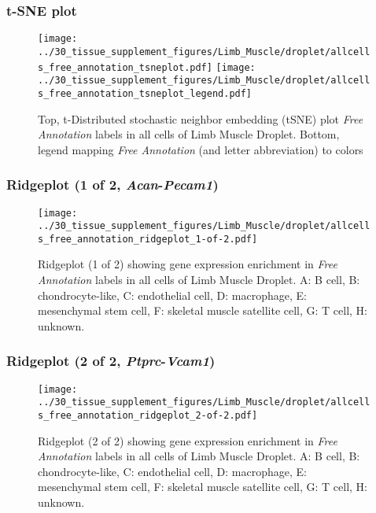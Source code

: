 \subsubsection{t-SNE plot}
\begin{figure}[h]
\centering
\texttt{[image: ../30\_tissue\_supplement\_figures/Limb\_Muscle/droplet/allcells\_free\_annotation\_tsneplot.pdf]}
\texttt{[image: ../30\_tissue\_supplement\_figures/Limb\_Muscle/droplet/allcells\_free\_annotation\_tsneplot\_legend.pdf]}
\caption{Top, t-Distributed stochastic neighbor embedding (tSNE) plot  \emph{Free Annotation} labels in all cells of Limb Muscle Droplet. Bottom, legend mapping \emph{Free Annotation} (and letter abbreviation) to colors}
\end{figure}


\clearpage

\subsubsection{Ridgeplot (1 of 2, \emph{Acan}-\emph{Pecam1})}
\begin{figure}[h]
\centering
\texttt{[image: ../30\_tissue\_supplement\_figures/Limb\_Muscle/droplet/allcells\_free\_annotation\_ridgeplot\_1-of-2.pdf]}

\caption{ Ridgeplot (1 of 2)  showing gene expression enrichment in \emph{Free Annotation} labels in all cells of Limb Muscle Droplet. A: B cell, B: chondrocyte-like, C: endothelial cell, D: macrophage, E: mesenchymal stem cell, F: skeletal muscle satellite cell, G: T cell, H: unknown.}
\end{figure}


\clearpage

\subsubsection{Ridgeplot (2 of 2, \emph{Ptprc}-\emph{Vcam1})}
\begin{figure}[h]
\centering
\texttt{[image: ../30\_tissue\_supplement\_figures/Limb\_Muscle/droplet/allcells\_free\_annotation\_ridgeplot\_2-of-2.pdf]}

\caption{ Ridgeplot (2 of 2)  showing gene expression enrichment in \emph{Free Annotation} labels in all cells of Limb Muscle Droplet. A: B cell, B: chondrocyte-like, C: endothelial cell, D: macrophage, E: mesenchymal stem cell, F: skeletal muscle satellite cell, G: T cell, H: unknown.}
\end{figure}


